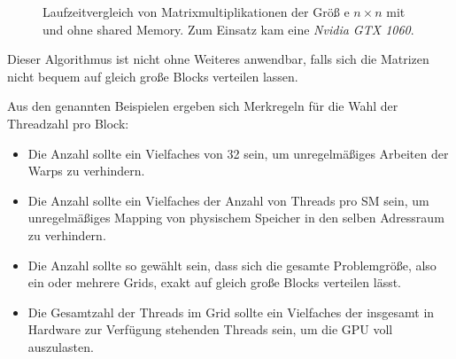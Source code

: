         \begin{figure}[h]
  		\centering
  		\caption[Matrixmultiplikation shared Memory]{Laufzeitvergleich von Matrixmultiplikationen der Größ e $n\times n$ mit und ohne shared Memory. Zum Einsatz kam eine \textit{Nvidia GTX 1060}.}
  		\label{fig3:matmul}
		\end{figure}
        
        Dieser Algorithmus ist nicht ohne Weiteres anwendbar, falls sich die Matrizen nicht bequem auf gleich große \Glspl{Block} verteilen lassen.
        
        Aus den genannten Beispielen ergeben sich Merkregeln für die Wahl der \Gls{Thread}zahl pro \Gls{Block}:
        \begin{itemize}
        	\item Die Anzahl sollte ein Vielfaches von 32 sein, um unregelmäßiges Arbeiten der \Glspl{Warp} zu verhindern.
        	\item Die Anzahl sollte ein Vielfaches der Anzahl von \Glspl{Thread} pro \Gls{SM} sein, um unregelmäßiges Mapping von physischem Speicher in den selben Adressraum zu verhindern.
        	\item Die Anzahl sollte so gewählt sein, dass sich die gesamte Problemgröße, also ein oder mehrere \Glspl{Grid}, exakt auf gleich große \Glspl{Block} verteilen lässt.
        	\item Die Gesamtzahl der \Glspl{Thread} im \Gls{Grid} sollte ein Vielfaches der insgesamt in Hardware zur Verfügung stehenden \Glspl{Thread} sein, um die GPU voll auszulasten.
        \end{itemize}
        
